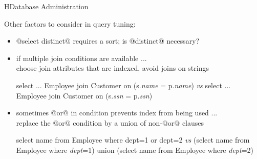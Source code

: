 \begin{lecture}{H}{Database Administration}
\begin{slide}
Other factors to consider in query tuning:
\begin{itemize}
\item @select distinct@ requires a sort; is @distinct@ necessary?
\item if multiple join conditions are available ... \\
	choose join attributes that are indexed, avoid joins on strings
\begin{indent}
\begin{small}
\begin{session}
    select ... Employee join Customer on (s.{\em{name}} = p.{\em{name}})
    {\textit{vs}}
    select ... Employee join Customer on (s.{\em{ssn}} = p.{\em{ssn}})
\end{session}
\end{small}
\end{indent}
\item sometimes @or@ in condition prevents index from being used ... \\
	replace the @or@ condition by a union of non-@or@ clauses
\begin{indent}
\begin{small}
\begin{session}
    select name from Employee where dept=1 or dept=2
    {\textit{vs}}
    (select name from Employee where {\em{dept}}=1)
    union
    (select name from Employee where {\em{dept}}=2)
\end{session}
\end{small}
\end{indent}
\end{itemize}
\end{slide}

\end{lecture}
